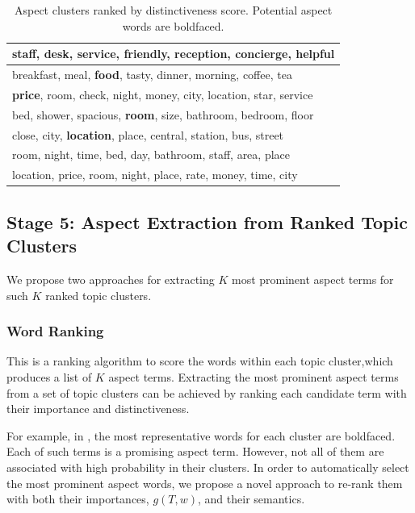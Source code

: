 \begin{table}[]
\caption{Aspect clusters ranked by distinctiveness score.
Potential aspect words are boldfaced.}
\label{table:clustersranked}
\centering
\small
\begin{tabular}{|l|} \hline
\textbf{staff}, desk, \textbf{service}, friendly, reception, concierge, helpful \\\hline
breakfast, meal, \textbf{food}, tasty, dinner, morning, coffee, tea \\\hline
\textbf{price}, room, check, night, money, city, location, star, service \\\hline
bed, shower, spacious, \textbf{room}, size, bathroom, bedroom, floor \\\hline
close, city, \textbf{location}, place, central, station, bus, street \\\hline
\textcolor{mygray}{room, night, time, bed, day, bathroom, staff, area, place} \\\hline
\textcolor{mygray}{location, price, room, night, place, rate, money, time, city} \\\hline
\end{tabular}
\end{table}

\subsection{Stage 5: Aspect Extraction from Ranked Topic Clusters}
\label{sec:word_ranking}
We propose two approaches for extracting $K$ most prominent aspect terms for such $K$ ranked topic clusters. 

\subsubsection{Word Ranking}
This is a ranking algorithm to score the words within each topic cluster,which produces a list of $K$ aspect terms.
Extracting the most prominent aspect terms from a set of topic clusters can be achieved by ranking each candidate term with their importance and distinctiveness. 

For example, in ,
the most representative words for each cluster are boldfaced.  
Each of such terms is a promising aspect term.
However, not all of them are associated with high probability 
in their clusters.  
In order to automatically select the most prominent aspect words,
we propose a novel approach to re-rank them with both their importances, $g(T,w)$, and their semantics.
 
